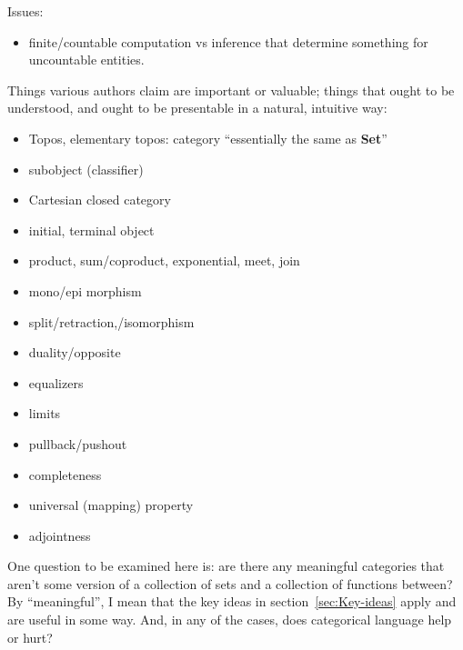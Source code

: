 \documentclass[11pt,openany]{article}
\begin{document}
Issues: 
\begin{itemize}
  \item finite/countable computation vs inference that determine
something for uncountable entities.
  \end{itemize}

\setcounter{currentlevel}{\value{baseSectionLevel}}
\label{sec:Key-ideas}

Things various authors claim are important or valuable;
things that ought to be understood,
and ought to be presentable in a natural, intuitive way:
\begin{itemize}
  \item Topos, elementary topos: 
  category ``essentially the same as \textbf{Set}''
  \item subobject (classifier)
  \item Cartesian closed category
  \item initial, terminal object
  \item product, sum/coproduct, exponential, meet, join
  \item mono/epi morphism
  \item split/retraction,/isomorphism
  \item duality/opposite
  \item equalizers
  \item limits
  \item pullback/pushout
  \item completeness
  \item universal (mapping) property
  \item adjointness
\end{itemize}

\setcounter{currentlevel}{\value{baseSectionLevel}}
\label{sec:Example-categories}

One question to be examined here is: are there any meaningful
categories that aren't some version of a collection of sets
and a collection of functions between? 
By ``meaningful'', I mean that the key ideas 
in section~\ref{sec:Key-ideas} apply
and are useful in some way.
And, in any of the cases, 
does categorical language help or hurt?
\end{document}
